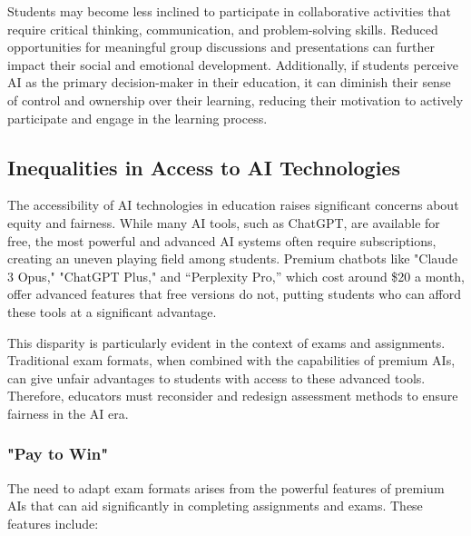 \documentclass{article}
\begin{document}
Students may become less inclined to participate in collaborative activities that require critical thinking, communication, and problem-solving skills. Reduced opportunities for meaningful group discussions and presentations can further impact their social and emotional development. Additionally, if students perceive AI as the primary decision-maker in their education, it can diminish their sense of control and ownership over their learning, reducing their motivation to actively participate and engage in the learning process.

\subsection{Inequalities in Access to AI Technologies}

The accessibility of AI technologies in education raises significant concerns about equity and fairness. While many AI tools, such as ChatGPT, are available for free, the most powerful and advanced AI systems often require subscriptions, creating an uneven playing field among students. Premium chatbots like "Claude 3 Opus," "ChatGPT Plus," and “Perplexity Pro,” which cost around \$20 a month, %
offer advanced features that free versions do not, putting students who can afford these tools at a significant advantage.

This disparity is particularly evident in the context of exams and assignments. Traditional exam formats, when combined with the capabilities of premium AIs, can give unfair advantages to students with access to these advanced tools. Therefore, educators must reconsider and redesign assessment methods to ensure fairness in the AI era.

\subsubsection{"Pay to Win"}

The need to adapt exam formats arises from the powerful features of premium AIs that can aid significantly in completing assignments and exams. These features include:
\end{document}
